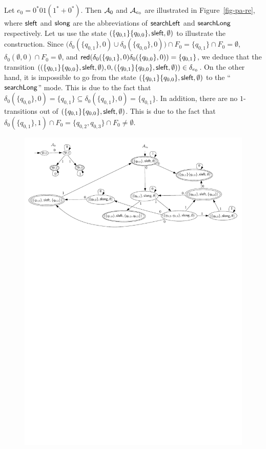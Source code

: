 \begin{example}\label{exmp-pa-re}
	Let $e_0 = 0^*0 1(1^* + 0^*)$. Then $\mathcal{A}_{0}$ and $\mathcal{A}_{e_0}$ are illustrated in Figure~\ref{fig-pa-re}, where ${\sf sleft}$ and ${\sf slong}$ are the abbreviations of $\mathsf{searchLeft}$ and $\mathsf{searchLong}$ respectively. Let us use the state $(\{q_{0,1}\}\{q_{0,0}\}, {\sf sleft}, \emptyset)$ to illustrate the construction. Since $\big(\delta_0(\{q_{0,1}\}, 0) \cup \delta_0(\{q_{0,0}\}, 0)\big) \cap F_0 = \{q_{0,1}\} \cap F_0 = \emptyset$, $\delta_0(\emptyset, 0) \cap F_0 = \emptyset$, and $\mathsf{red}(\delta_0(\{q_{0,1}\}, 0) \delta_0(\{q_{0,0}\}, 0))=\{q_{0,1}\}$, we deduce that the transition $((\{q_{0,1}\}\{q_{0,0}\}, {\sf sleft}, \emptyset), 0, (\{q_{0,1}\} \{q_{0,0}\}, {\sf sleft}, \emptyset)) \in \delta_{e_0}$. On the other hand, it is impossible to go from the state $(\{q_{0,1}\}\{q_{0,0}\}, {\sf sleft}, \emptyset)$ to the ``$\mathsf{searchLong}$'' mode. This is due to the fact that $\delta_0(\{q_{0,0}\}, 0)=\{q_{0,1}\} \subseteq \delta_0(\{q_{0,1}\},0)=\{q_{0,1}\}$. In addition, there are no $1$-transitions out of $(\{q_{0,1}\}\{q_{0,0}\}, {\sf sleft}, \emptyset)$. This is due to the fact that $\delta_0(\{q_{0,1}\}, 1) \cap F_0 = \{q_{0,2}, q_{0,3}\} \cap F_0 \neq \emptyset$.
	\begin{figure}[htbp]
		\begin{center}
			\includegraphics[scale=0.7]{regular-expression-example.pdf}

\end{center}
\end{figure}
\end{example}
